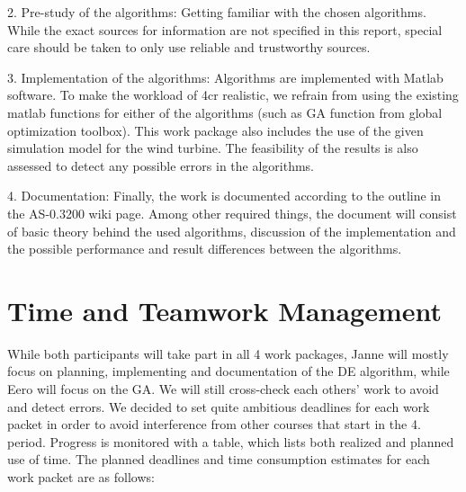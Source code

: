\documentclass[twoside]{article}
\begin{document}
\begin{multicols}{2}
2. Pre-study of the algorithms:
Getting familiar with the chosen algorithms. While the exact sources for information are not specified in this report, special care should be taken to only use reliable and trustworthy sources.

3. Implementation of the algorithms:
Algorithms are implemented with Matlab software. To make the workload of 4cr realistic, we refrain from using the existing matlab functions for either of the algorithms (such as GA function from global optimization toolbox). This work package also includes the use of the given simulation model for the wind turbine. The feasibility of the results is also assessed to detect any possible errors in the algorithms.

4. Documentation:
Finally, the work is documented according to the outline in the AS-0.3200 wiki page. Among other required things, the document will consist of basic theory behind the used algorithms, discussion of the implementation and the possible performance and result differences between the algorithms.




\section{Time and Teamwork Management}

While both participants will take part in all 4 work packages, Janne will mostly focus on planning, implementing and documentation of the DE algorithm, while Eero will focus on the GA. We will still cross-check each others' work to avoid and detect errors. We decided to set quite ambitious deadlines for each work packet in order to avoid interference from other courses that start in the 4. period. Progress is monitored with a table, which lists both realized and planned use of time. The planned deadlines and time consumption estimates for each work packet are as follows:


\end{multicols}
\end{document}
